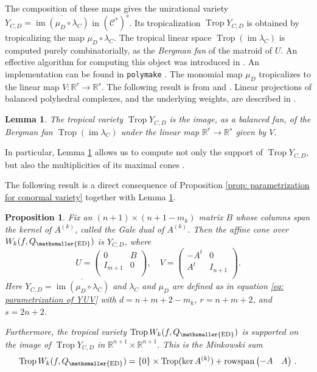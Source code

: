 \documentclass[11pt,reqno]{amsart}
\numberwithin{equation}{section}
\theoremstyle{plain}
\numberwithin{theorem}{section}
\newtheorem{proposition}[theorem]{Proposition}
\newtheorem{lemma}[theorem]{Lemma}
\theoremstyle{definition}
\newcommand{\R}{\mathbb{R}}
\newcommand{\CC}{\mathcal{C}}
\DeclareMathOperator{\Trop}{Trop}
\newcommand{\image}{\operatorname{im}}
\newcommand{\rowspan}{\operatorname{rowspan}}
\newcommand{\mED}{\mathsmaller{\mathrm{ED}}}
\begin{document}
The composition of these maps gives the unirational variety
$Y_{C,D} = \overline{\image( \mu_D \circ \lambda_C )}$ in $(\CC^*)^s$.
Its tropicalization $\Trop Y_{C,D}$ is obtained by tropicalizing the map $\mu_D \circ \lambda_C$.
The tropical linear space $\Trop(\image\lambda_C)$ is computed
purely combinatorially, as the {\em Bergman fan} of the matroid of $U$. An effective algorithm for computing this object was introduced in \cite{RINCON201386}. An implementation can be found in \texttt{polymake} \cite{Gawrilow2000}.
The monomial map $\mu_D$ tropicalizes to the linear map $V\colon\R^r \to \R^s$.
The following result is from \cite[Theorem 3.1]{Tropical_Discriminants} and
\cite[Theorem 5.5.1]{maclagan2015introduction}.
Linear projections of balanced polyhedral complexes, and the underlying weights, are described in \cite[Lemma 3.6.3]{maclagan2015introduction}.

\begin{lemma}
\label{lemma: tropicalizing monomial maps}
The tropical variety $\Trop Y_{C,D}$ is the image, as a balanced fan, of the Bergman fan $\Trop(\image\lambda_C)$ under the linear map $\R^r \to \R^s$ given by $V$.
\end{lemma}
\noindent
In particular, Lemma \ref{lemma: tropicalizing monomial maps} allows us to compute not only the support of $\Trop Y_{C,D}$, but also the multiplicities of its maximal cones \cite[Definition 3.4.3]{algorithmsInInvariantTheory}.

The following result is a direct consequence of Proposition \ref{prop: parametrization for conormal variety} together with Lemma \ref{lemma: tropicalizing monomial maps}.
\begin{proposition}   
\label{prop: description of conormal variety as Y_{C,D}}
Fix an $(n+1)\times(n+1-m_k)$ matrix $B$ whose columns span the kernel of $A^{(k)} $, called the {\em Gale dual} of $A^{(k)}$. 
Then the affine cone over $W_k(f,Q_\mED)$ is
$Y_{C,D}$, where
\begin{equation}
\label{eq: Matrices U, V}
U = \begin{pmatrix}
0 & B \\
I_{m+1} & 0  \\
\end{pmatrix}, \quad
V = \begin{pmatrix}
-A^t & 0  \\
A^t & I_{n+1} \\
\end{pmatrix}.
\end{equation}
Here $Y_{C,D} = \overline{\image( \mu_D \circ \lambda_C )}$ and $ \lambda_C$ and $\mu_D$ are defined as in equation \eqref{eq: parametrization of YUV} with $d = n+m+2-m_k$, $r = n+m+2$, and $s = 2n+2$.

Furthermore, the tropical variety $\Trop W_k(f,Q_\mED) $ is supported
on the image of $\Trop Y_{C,D}$ in $\R^{n+1}\times \R^{n+1}$. This is the Minkowski sum
\[
\Trop W_k(f,Q_\mED) = \{0\} \times \Trop(\ker A^{(k)}) + \rowspan
\begin{pmatrix}
-A & A
\end{pmatrix}\,.
\]
\end{proposition}
\end{document}
